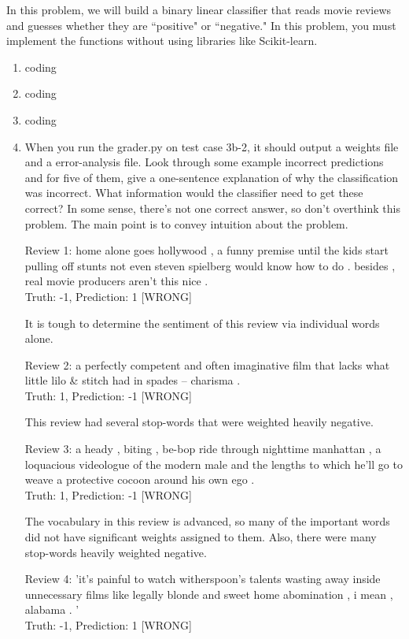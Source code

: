 \documentclass[10pt]{article}
\begin{document}
In this problem, we will build a binary linear classifier that reads movie reviews and guesses whether they are ``positive" or ``negative." In this problem, you must implement the functions without using libraries like Scikit-learn.

\begin{enumerate}[label=(\alph*)]

  \item coding
  \item coding
  \item coding
  
  \item When you run the grader.py on test case 3b-2, it should output a weights file and a error-analysis file. Look through some example incorrect predictions and for five of them, give a one-sentence explanation of why the classification was incorrect. What information would the classifier need to get these correct? In some sense, there's not one correct answer, so don't overthink this problem. The main point is to convey intuition about the problem.

	Review 1: home alone goes hollywood , a funny premise until the kids start pulling off stunts not even steven spielberg would know how to do . besides , real movie producers aren't this nice .\\
Truth: -1, Prediction: 1 [WRONG]

	It is tough to determine the sentiment of this review via individual words alone.

	Review 2: a perfectly competent and often imaginative film that lacks what little lilo \& stitch had in spades -- charisma .\\
Truth: 1, Prediction: -1 [WRONG]

	This review had several stop-words that were weighted heavily negative.

	Review 3: a heady , biting , be-bop ride through nighttime manhattan , a loquacious videologue of the modern male and the lengths to which he'll go to weave a protective cocoon around his own ego .\\
Truth: 1, Prediction: -1 [WRONG]

	The vocabulary in this review is advanced, so many of the important words did not have significant weights assigned to them. Also, there were many stop-words heavily weighted negative.

	Review 4: 'it's painful to watch witherspoon's talents wasting away inside unnecessary films like legally blonde and sweet home abomination , i mean , alabama . '\\
Truth: -1, Prediction: 1 [WRONG]


\end{enumerate}
\end{document}
